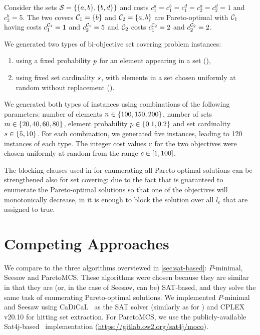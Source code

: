 \begin{example}
  Consider the sets $\mathcal{S} = \{ \{a, b\}, \{b, d\} \}$ and costs $c^a_1 = c^b_1 = c^d_1 = c^a_2 = c^d_2 = 1$ and $c^b_2 = 5$.
  The two covers $\mathcal{C}_1 = \{ b \}$ and $\mathcal{C}_2 = \{ a, b \}$ are Pareto-optimal with $\mathcal{C}_1$ having costs $c^{\mathcal{C}_1}_1 = 1$ and $c^{\mathcal{C}_1}_2 = 5$ and $\mathcal{C}_2$ costs $c^{\mathcal{C}_2}_1 = 2$ and $c^{\mathcal{C}_2}_2 = 2$.
\end{example}

We generated two types of  bi-objective set covering problem instances:
\begin{enumerate}[label=(\roman*)]
  \item using a fixed probability $p$ for an element appearing in a set (\scep{}),
  \item using fixed set cardinality $s$, with elements in a set chosen uniformly at random without replacement (\scsc{}).
\end{enumerate}
We generated both types of instances using combinations of the following parameters:
number of elements $n\in\{100,150,200\}$, number of sets $m\in\{20,40,60,80\}$, element probability $p\in\{0.1,0.2\}$ and set cardinality $s\in\{5,10\}$.
For each combination, we generated five instances, leading to 120 instances of each type.
The integer cost values $c$ for the two objectives were chosen uniformly at random from the range $c\in[1,100]$.

The blocking clauses used in \algname{} for enumerating all Pareto-optimal solutions can be strengthened also for set covering:
due to the fact that \algname{} is guaranteed to enumerate the Pareto-optimal solutions so that one of the objectives will monotonically decrease, in \algname{} it is enough to block the solution over all $l_e$ that are assigned to true.

\section{Competing Approaches\label{sec:competing}}

We compare \algname{} to the three algorithms overviewed in \cref{sec:sat-based}: $P$-minimal, Seesaw and ParetoMCS.
These algorithms were chosen because they are similar in that they are (or, in the case of Seesaw, can be) SAT-based, and they solve the same task of enumerating Pareto-optimal solutions.
We implemented $P$-minimal and Seesaw using CaDiCaL~\autocite{BiereFazekasFleuryHeisinger-SAT-Competition-2020-solvers} as the SAT solver (similarly as for \algname{}) and CPLEX v20.10 for hitting set extraction.
For ParetoMCS, we use the publicly-available Sat4j-based~\autocite{DBLP:journals/jsat/BerreP10} implementation ({\small\url{https://gitlab.ow2.org/sat4j/moco}}).

